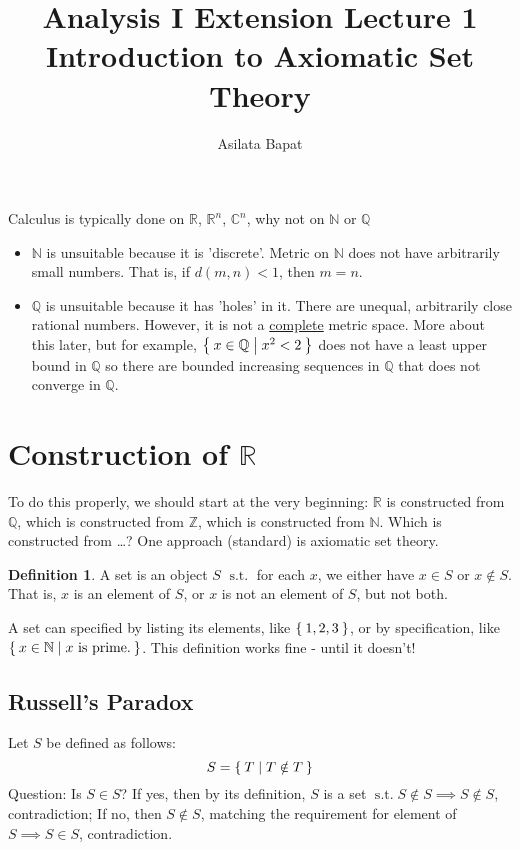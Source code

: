\documentclass[12pt]{amsart}
\title{Analysis I Extension Lecture 1\\Introduction to Axiomatic Set Theory}
\author{Asilata Bapat}
\newcommand{\bbR}{\mathbb{R}}
\newcommand{\bbN}{\mathbb{N}}
\newcommand{\bbZ}{\mathbb{Z}}
\newcommand{\bbQ}{\mathbb{Q}}
\newcommand{\bbC}{\mathbb{C}}
\newcommand{\suchthat}{\operatorname{s.t.}}
\theoremstyle{plain}
\theoremstyle{remark}
\theoremstyle{definition}
\newtheorem*{define}{Definition}
\begin{document}
\maketitle
{}

Calculus is typically done on $\bbR$, $\bbR^n$, $\bbC^n$, why not on $\bbN$ or $\bbQ$
\begin{itemize}[-]
	\item $\bbN$ is unsuitable because it is 'discrete'. Metric on $\bbN$ does not have arbitrarily small numbers. That is, if $d(m,n) < 1$, then $m = n$.
	\item $\bbQ$ is unsuitable because it has 'holes' in it. There are unequal, arbitrarily close rational numbers. However, it is not a 	     \ul{complete} metric space.
	\newline
	More about this later, but for example, $\Set{x \in \bbQ | x^2 < 2}$ does not have a least upper bound in $\bbQ$ so there are bounded increasing sequences in $\bbQ$ that does not converge in $\bbQ$.
\end{itemize}

\section*{Construction of $\bbR$}
To do this properly, we should start at the very beginning: $\bbR$ is constructed from $\bbQ$, which is constructed from $\bbZ$, which is constructed from $\bbN$. Which is constructed from \dots ?
\newline
One approach (standard) is axiomatic set theory.
\begin{define}
	A set is an object $S$ $\suchthat$ for each $x$, we either have $x \in S$ or $x \notin S$. That is, $x$ is an element of $S$, or $x$ is not an element of $S$, but not both.
\end{define}
A set can specified by listing its elements, like $\Set{1, 2, 3}$, or by specification, like $\Set{x \in \bbN| x \text{ is prime.}}$. This definition works fine - until it doesn't!
\newline
\subsection*{Russell's Paradox}
Let $S$ be defined as follows:
\begin{equation*}
	S = \Set{T| T \notin T}
\end{equation*}
Question: Is $S \in S$?
\newline
If yes, then by its definition, $S$ is a set $\suchthat S \notin S \implies S \notin S$, contradiction;
If no, then $S \notin S$, matching the requirement for element of $S \implies S \in S$, contradiction.
\end{document}
